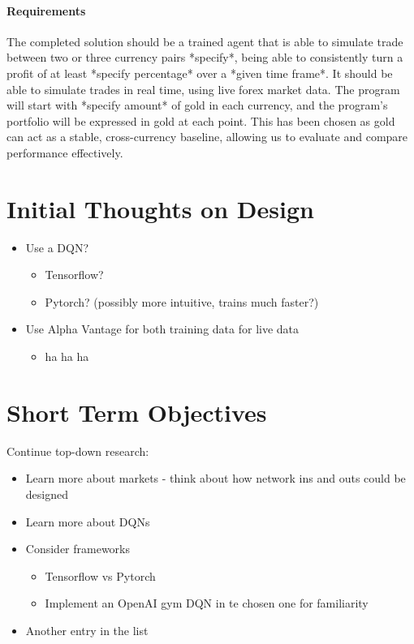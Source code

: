 \documentclass{article}
\begin{document}
		\paragraph{Requirements} The completed solution should be a trained agent that is able to simulate trade between two or three currency pairs *specify*, being able to consistently turn a profit of at least *specify percentage* over a *given time frame*. It should be able to simulate trades in real time, using live forex market data. The program will start with *specify amount* of gold in each currency, and the program's portfolio will be expressed in gold at each point. This has been chosen as gold can act as a stable, cross-currency baseline, allowing us to evaluate and compare performance effectively.
		
   
	\section{Initial Thoughts on Design}
		
		\begin{itemize}
  			\item Use a DQN? 
  			\begin{itemize}
  				\item Tensorflow?
  				\item Pytorch? (possibly more intuitive, trains much faster?)
  			\end{itemize}
  			\item Use Alpha Vantage for both training data for live data
  			\begin{itemize}
  				\item ha ha ha
  			\end{itemize}
		\end{itemize}


	\section{Short Term Objectives}   
   		Continue top-down research:
   		\begin{itemize}
  			\item Learn more about markets - think about how network ins and outs could be designed
  			\item Learn more about DQNs
  			\item Consider frameworks
  				\begin{itemize}
  					\item Tensorflow vs Pytorch
  					\item Implement an OpenAI gym DQN in te chosen one for familiarity
  				\end{itemize}
  			\item Another entry in the list
		\end{itemize}
   
   
\end{document}

